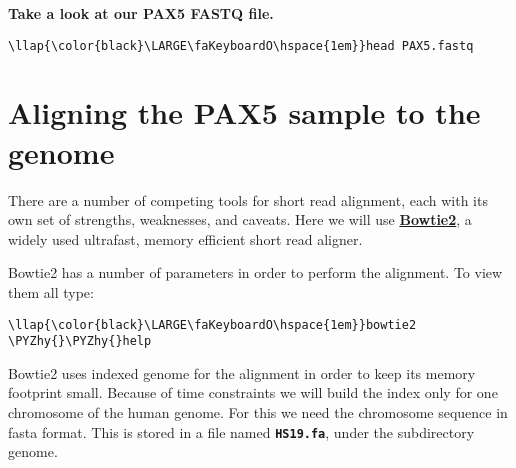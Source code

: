 \documentclass[11pt]{article}
\def\PYZhy{\char`\-}
\begin{document}
    \textbf{Take a look at our PAX5 FASTQ file.}





\begin{terminalinput}
\begin{Verbatim}[commandchars=\\\{\}]
\llap{\color{black}\LARGE\faKeyboardO\hspace{1em}}head PAX5.fastq
\end{Verbatim}
\end{terminalinput}





\newpage





    \hypertarget{aligning-the-pax5-sample-to-the-genome}{%
\section{Aligning the PAX5 sample to the
genome}\label{aligning-the-pax5-sample-to-the-genome}}

There are a number of competing tools for short read alignment, each
with its own set of strengths, weaknesses, and caveats. Here we will use
\href{http://bowtie-bio.sourceforge.net/bowtie2/index.shtml}{\textbf{Bowtie2}},
a widely used ultrafast, memory efficient short read aligner.

Bowtie2 has a number of parameters in order to perform the alignment. To
view them all type:





\begin{terminalinput}
\begin{Verbatim}[commandchars=\\\{\}]
\llap{\color{black}\LARGE\faKeyboardO\hspace{1em}}bowtie2 \PYZhy{}\PYZhy{}help
\end{Verbatim}
\end{terminalinput}



    Bowtie2 uses indexed genome for the alignment in order to keep its
memory footprint small. Because of time constraints we will build the
index only for one chromosome of the human genome. For this we need the
chromosome sequence in fasta format. This is stored in a file named
\textbf{\texttt{HS19.fa}}, under the subdirectory genome.
\end{document}
